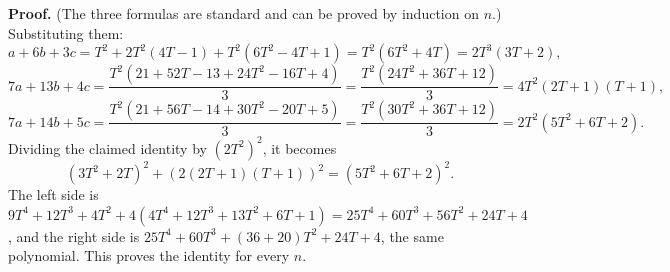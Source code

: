 \textbf{Proof.} (The three formulas are standard and can be proved by induction on $n$.) Substituting them:
\[
a+6b+3c=T^2+2T^2(4T-1)+T^2\left(6T^2-4T+1\right)=T^2\left(6T^2+4T\right)=2T^3(3T+2),
\]
\[
7a+13b+4c=\dfrac{T^2\left(21+52T-13+24T^2-16T+4\right)}{3}=\dfrac{T^2\left(24T^2+36T+12\right)}{3}=4T^2(2T+1)(T+1),
\]
\[
7a+14b+5c=\dfrac{T^2\left(21+56T-14+30T^2-20T+5\right)}{3}=\dfrac{T^2\left(30T^2+36T+12\right)}{3}=2T^2\left(5T^2+6T+2\right).
\]
Dividing the claimed identity by $\left(2T^2\right)^2$, it becomes
\[
\left(3T^2+2T\right)^2+\left(2(2T+1)(T+1)\right)^2=\left(5T^2+6T+2\right)^2 .
\]
The left side is $9T^4+12T^3+4T^2+4\left(4T^4+12T^3+13T^2+6T+1\right)=25T^4+60T^3+56T^2+24T+4$, and the right side is $25T^4+60T^3+(36+20)T^2+24T+4$, the same polynomial. This proves the identity for every $n$.
